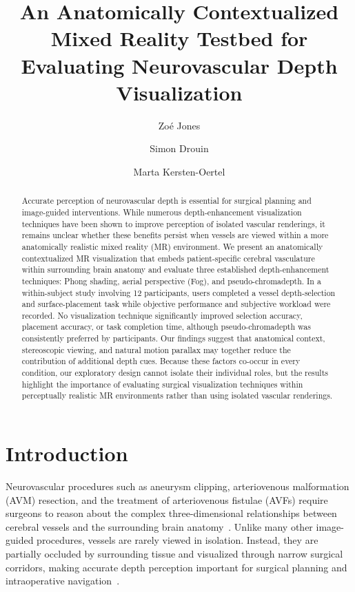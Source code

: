 \documentclass[runningheads]{llncs}
\begin{document}
\title{An Anatomically Contextualized Mixed Reality Testbed for Evaluating Neurovascular Depth Visualization}
\author{Zo\'e Jones \and
Simon Drouin \and
Marta Kersten-Oertel}

    
\maketitle
\begin{abstract}
Accurate perception of neurovascular depth is essential for surgical planning and image-guided interventions. While numerous depth-enhancement visualization techniques have been shown to improve perception of isolated vascular renderings, it remains unclear whether these benefits persist when vessels are viewed within a more anatomically realistic mixed reality (MR) environment. We present an anatomically contextualized MR visualization that embeds patient-specific cerebral vasculature within surrounding brain anatomy and evaluate three established depth-enhancement techniques: Phong shading, aerial perspective (Fog), and pseudo-chromadepth. In a within-subject study involving 12 participants, users completed a vessel depth-selection and surface-placement task while objective performance and subjective workload were recorded. No visualization technique significantly improved selection accuracy, placement accuracy, or task completion time, although pseudo-chromadepth was consistently preferred by participants. Our findings suggest that anatomical context, stereoscopic viewing, and natural motion parallax may together reduce the contribution of additional depth cues. Because these factors co-occur in every condition, our exploratory design cannot isolate their individual roles, but the results highlight the importance of evaluating surgical visualization techniques within perceptually realistic MR environments rather than using isolated vascular renderings.


\end{abstract}
\section{Introduction}\label{sec:intro}

Neurovascular procedures such as aneurysm clipping, arteriovenous malformation (AVM) resection, and the treatment of arteriovenous fistulae (AVFs) require surgeons to reason about the complex three-dimensional relationships between cerebral vessels and the surrounding brain anatomy~\cite{preim_survey_2016}. Unlike many other image-guided procedures, vessels are rarely viewed in isolation. Instead, they are partially occluded by surrounding tissue and visualized through narrow surgical corridors, making accurate depth perception important for surgical planning and intraoperative navigation~\cite{kersten-oertel_augmented_2015-1}.
\end{document}
